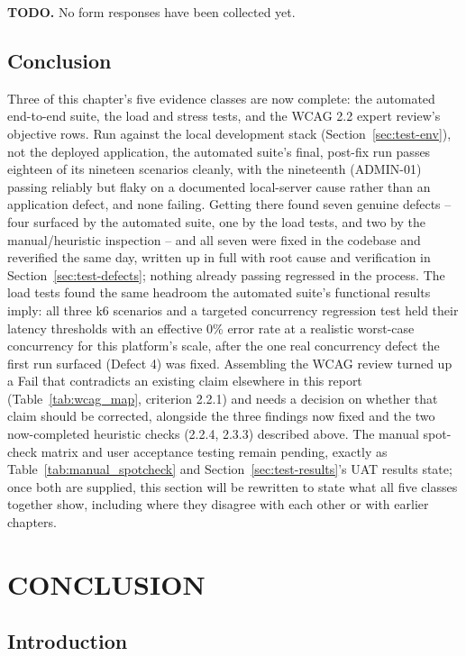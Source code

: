 \documentclass[12pt, oneside]{article} %
\begin{document}
\textbf{TODO.} No form responses have been collected yet.

\subsection{Conclusion}

Three of this chapter's five evidence classes are now complete: the automated end-to-end suite, the load and stress tests, and the WCAG 2.2 expert review's objective rows. Run against the local development stack (Section~\ref{sec:test-env}), not the deployed application, the automated suite's final, post-fix run passes eighteen of its nineteen scenarios cleanly, with the nineteenth (ADMIN-01) passing reliably but flaky on a documented local-server cause rather than an application defect, and none failing. Getting there found seven genuine defects -- four surfaced by the automated suite, one by the load tests, and two by the manual/heuristic inspection -- and all seven were fixed in the codebase and reverified the same day, written up in full with root cause and verification in Section~\ref{sec:test-defects}; nothing already passing regressed in the process. The load tests found the same headroom the automated suite's functional results imply: all three k6 scenarios and a targeted concurrency regression test held their latency thresholds with an effective 0\% error rate at a realistic worst-case concurrency for this platform's scale, after the one real concurrency defect the first run surfaced (Defect 4) was fixed. Assembling the WCAG review turned up a Fail that contradicts an existing claim elsewhere in this report (Table~\ref{tab:wcag_map}, criterion 2.2.1) and needs a decision on whether that claim should be corrected, alongside the three findings now fixed and the two now-completed heuristic checks (2.2.4, 2.3.3) described above. The manual spot-check matrix and user acceptance testing remain pending, exactly as Table~\ref{tab:manual_spotcheck} and Section~\ref{sec:test-results}'s UAT results state; once both are supplied, this section will be rewritten to state what all five classes together show, including where they disagree with each other or with earlier chapters.

\newpage
\section{CONCLUSION}
\label{sec:conclusion}

\subsection{Introduction}
\end{document}
